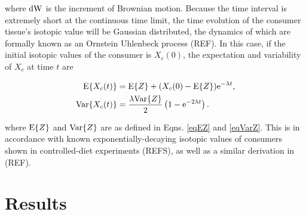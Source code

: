 \documentclass[11pt]{article}
\begin{document}
\noindent where ${\rm dW}$ is the increment of Brownian motion.
Because the time interval is extremely short at the continuous time limit, the time evolution of the consumer tissue's isotopic value will be Gaussian distributed, the dynamics of which are formally known as an Ornstein Uhlenbeck process (REF).
In this case, if the initial isotopic values of the consumer is $X_c(0)$, the expectation and variability of $X_c$ at time $t$ are

\begin{align}
{\rm E}\{X_c(t)\} &= {\rm E}\{Z\} + (X_c(0) - {\rm E}\{Z\}){\rm e}^{-\lambda t}, \nonumber \\
{\rm Var}\{X_c(t)\} &= \frac{\lambda {\rm Var}\{Z\}}{2}\left(1 - {\rm e}^{-2\lambda t}\right).
\end{align}

\noindent where ${\rm E}\{Z\}$ and ${\rm Var}\{Z\}$ are as defined in Eqns. \ref{eqEZ} and \ref{eqVarZ}.
This is in accordance with known exponentially-decaying isotopic values of consumers shown in controlled-diet experiments (REFS), as well as a similar derivation in (REF).





\section{Results}



\end{document}
